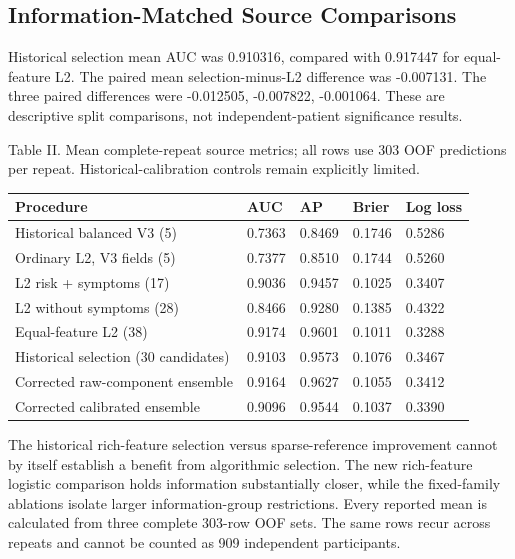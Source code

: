 \documentclass[conference]{IEEEtran}
\begin{document}
\subsection{Information-Matched Source Comparisons}
Historical selection mean AUC was 0.910316, compared with 0.917447 for equal-feature L2. The paired mean selection-minus-L2 difference was -0.007131. The three paired differences were -0.012505, -0.007822, -0.001064. These are descriptive split comparisons, not independent-patient significance results.

\begin{center}\begin{minipage}{\columnwidth}\centering\footnotesize
Table II. Mean complete-repeat source metrics; all rows use 303 OOF predictions per repeat. Historical-calibration controls remain explicitly limited.\par\vspace{3pt}
\setlength{\tabcolsep}{2.5pt}
\begin{tabular}{p{}p{}p{}p{}p{}}
\toprule
Procedure & AUC & AP & Brier & Log loss \\
\midrule
Historical balanced V3 (5) & 0.7363 & 0.8469 & 0.1746 & 0.5286 \\
Ordinary L2, V3 fields (5) & 0.7377 & 0.8510 & 0.1744 & 0.5260 \\
L2 risk + symptoms (17) & 0.9036 & 0.9457 & 0.1025 & 0.3407 \\
L2 without symptoms (28) & 0.8466 & 0.9280 & 0.1385 & 0.4322 \\
Equal-feature L2 (38) & 0.9174 & 0.9601 & 0.1011 & 0.3288 \\
Historical selection (30 candidates) & 0.9103 & 0.9573 & 0.1076 & 0.3467 \\
Corrected raw-component ensemble & 0.9164 & 0.9627 & 0.1055 & 0.3412 \\
Corrected calibrated ensemble & 0.9096 & 0.9544 & 0.1037 & 0.3390 \\
\bottomrule
\end{tabular}
\end{minipage}\end{center}

The historical rich-feature selection versus sparse-reference improvement cannot by itself establish a benefit from algorithmic selection. The new rich-feature logistic comparison holds information substantially closer, while the fixed-family ablations isolate larger information-group restrictions. Every reported mean is calculated from three complete 303-row OOF sets. The same rows recur across repeats and cannot be counted as 909 independent participants.
\end{document}

